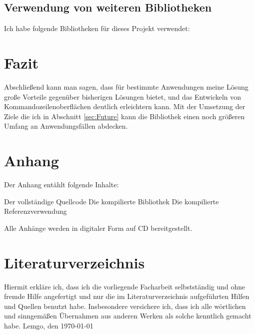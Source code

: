 \documentclass[a4paper,11pt,titlepage,ngerman]{article}
\newcommand{\inlinecode}[1]{{\lstinline[language=]$#1$}}
\begin{document}
\begin{sloppypar}
  \subsection{Verwendung von weiteren Bibliotheken}\label{subsec:UsageOfLibraries}
  Ich habe folgende Bibliotheken für dieses Projekt verwendet:
  \section{Fazit}\label{sec:Conclusion}
Abschlie\ss end kann man sagen, dass für bestimmte Anwendungen meine Lösung gro\ss e Vorteile gegenüber bisherigen Lösungen bietet, 
  und das Entwickeln von Kommandozeilenoberflächen deutlich erleichtern kann.
Mit der Umsetzung der Ziele die ich in Abschnitt \ref{sec:Future} kann die Bibliothek einen noch grö\ss eren Umfang an Anwendungsfällen abdecken. 
  \newpage
  \section{Anhang}\label{sec:Attachments}
  Der Anhang entählt folgende Inhalte:
  \begin{outline}
   \1 Der vollständige Quellcode
   \1 Die kompilierte Bibliothek
   \1 Die kompilierte Referenzverwendung
  \end{outline}
  Alle Anhänge werden in digitaler Form auf CD bereitgestellt.
  \section{Literaturverzeichnis}\label{sec:Literature}
  \printbibliography[heading=none]
  \newpage
  \begin{samepage}
	\thispagestyle{empty}
	Hiermit erkläre ich, dass ich die vorliegende Facharbeit selbstständig und ohne fremde Hilfe angefertigt und nur die im Literaturverzeichnis
	aufgeführten Hilfen und Quellen benutzt habe.
	Insbesondere versichere ich, dass ich alle wörtlichen
	und sinngemä\ss en Übernahmen aus anderen Werken als solche kenntlich gemacht habe.
	\medbreak
	Lemgo, den \today
	\medbreak
  \end{samepage}
 \end{sloppypar}
\end{document}
